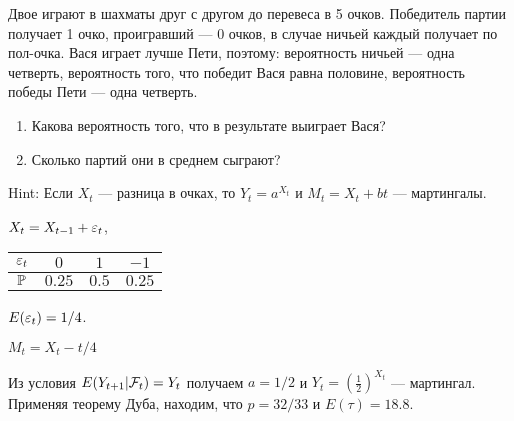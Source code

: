 \begin{problem}
Двое играют в шахматы друг с другом до перевеса в 5 очков. Победитель партии получает 1 очко, проигравший — 0 очков, в случае ничьей каждый получает по пол-очка. Вася играет лучше Пети, поэтому: вероятность ничьей — одна четверть, вероятность того, что победит Вася равна половине, вероятность победы Пети — одна четверть.
\begin{enumerate}
\item Какова вероятность того, что в результате выиграет Вася?
\item Сколько партий они в среднем сыграют?
\end{enumerate}


\begin{sol}

Hint:  Если $X_{t}$ — разница в очках, то $Y_t=a^{X_{t}}$ и $M_t=X_{t}+bt$ — мартингалы.

$X_t=X_{t-1}+\e_t$,

\begin{tabular}{cccc}
$\e_t$ & $0$ & $1$ & $-1$ \\
\hline
$\P$ & $0.25$ & $0.5$ & $0.25$ \\
\end{tabular}

$E(\e_t)=1/4$.

$M_t=X_t-t/4$

Из условия $E(Y_{t+1}|\cF_t)=Y_t$ получаем $a=1/2$ и $Y_t=\left( \frac{1}{2} \right)^{X_t}$ — мартингал. Применяя теорему Дуба, находим, что $p=32/33$ и $E(\tau)=18.8$.


\end{sol}
\end{problem}

